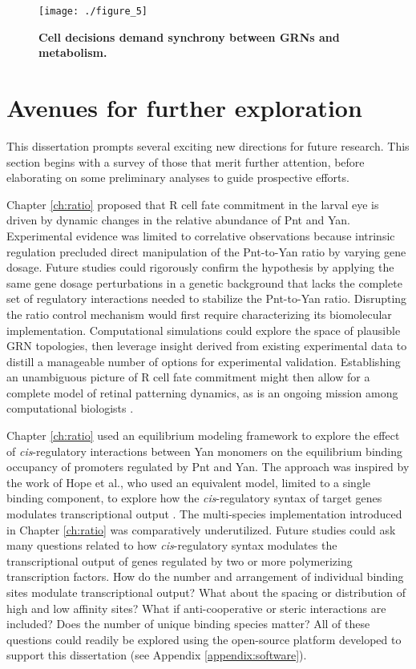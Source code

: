 \begin{figure}[h!]
\centering
\texttt{[image: ./figure\_5]}
\caption[Cell decisions demand synchrony between GRN dynamics and metabolism.]{\textbf{Cell decisions demand synchrony between GRNs and metabolism.}}
\label{fig:conc:fig5}
\end{figure}

\section{Avenues for further exploration}

This dissertation prompts several exciting new directions for future research. This section begins with a survey of those that merit further attention, before elaborating on some preliminary analyses to guide prospective efforts.

Chapter \ref{ch:ratio} proposed that R cell fate commitment in the larval eye is driven by dynamic changes in the relative abundance of Pnt and Yan. Experimental evidence was limited to correlative observations because intrinsic regulation precluded direct manipulation of the Pnt-to-Yan ratio by varying gene dosage. Future studies could rigorously confirm the hypothesis by applying the same gene dosage perturbations in a genetic background that lacks the complete set of regulatory interactions needed to stabilize the Pnt-to-Yan ratio. Disrupting the ratio control mechanism would first require characterizing its biomolecular implementation. Computational simulations could explore the space of plausible GRN topologies, then leverage insight derived from existing experimental data to distill a manageable number of options for experimental validation. Establishing an unambiguous picture of R cell fate commitment might then allow for a complete model of retinal patterning dynamics, as is an ongoing mission among computational biologists \cite{Lubensky2011,Gavish2016}.

Chapter \ref{ch:ratio} used an equilibrium modeling framework to explore the effect of \textit{cis}-regulatory interactions between Yan monomers on the equilibrium binding occupancy of promoters regulated by Pnt and Yan. The approach was inspired by the work of Hope et al., who used an equivalent model, limited to a single binding component, to explore how the \textit{cis}-regulatory syntax of target genes modulates transcriptional output \cite{Hope2017}. The multi-species implementation introduced in Chapter \ref{ch:ratio} was comparatively underutilized. Future studies could ask many questions related to how \textit{cis}-regulatory syntax modulates the transcriptional output of genes regulated by two or more polymerizing transcription factors. How do the number and arrangement of individual binding sites modulate transcriptional output? What about the spacing or distribution of high and low affinity sites? What if anti-cooperative or steric interactions are included? Does the number of unique binding species matter? All of these questions could readily be explored using the open-source platform developed to support this dissertation (see Appendix \ref{appendix:software}).

